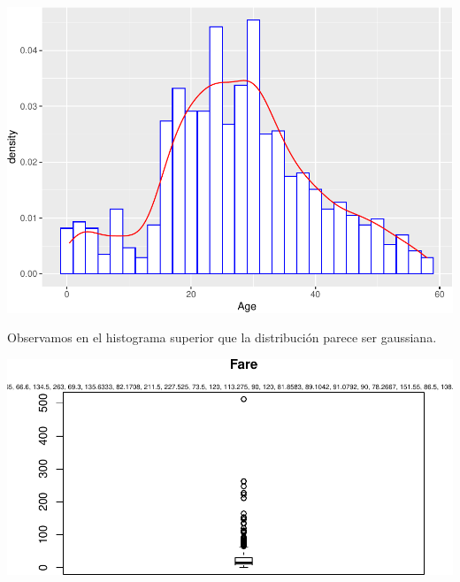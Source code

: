 \documentclass[]{article}
\newenvironment{Shaded}{\begin{snugshade}}{\end{snugshade}}
\newcommand{\DataTypeTok}[1]{\textcolor[rgb]{0.13,0.29,0.53}{#1}}
\newcommand{\FloatTok}[1]{\textcolor[rgb]{0.00,0.00,0.81}{#1}}
\newcommand{\KeywordTok}[1]{\textcolor[rgb]{0.13,0.29,0.53}{\textbf{#1}}}
\newcommand{\NormalTok}[1]{#1}
\newcommand{\OperatorTok}[1]{\textcolor[rgb]{0.81,0.36,0.00}{\textbf{#1}}}
\newcommand{\StringTok}[1]{\textcolor[rgb]{0.31,0.60,0.02}{#1}}
\begin{document}
\includegraphics{titanic_data_analysis_PRA2_files/figure-latex/unnamed-chunk-12-1.pdf}

Observamos en el histograma superior que la distribución parece ser
gaussiana.

\begin{Shaded}
\end{Shaded}

\includegraphics{titanic_data_analysis_PRA2_files/figure-latex/unnamed-chunk-13-1.pdf}
\end{document}
